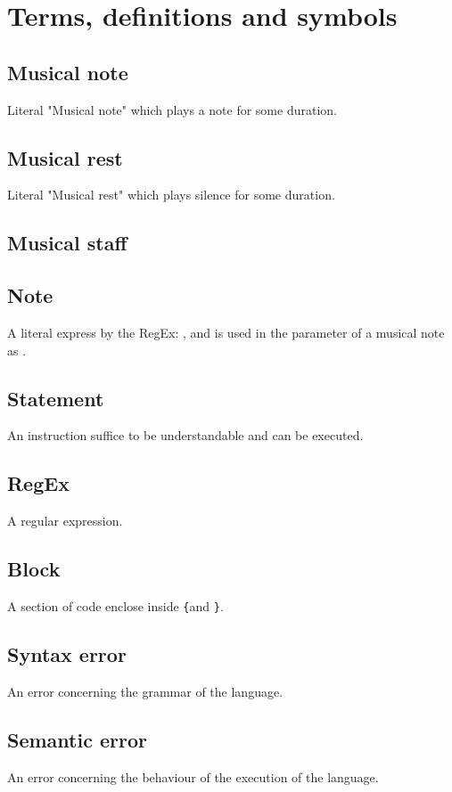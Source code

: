 \section{Terms, definitions and symbols}

\subsection{Musical note}

Literal "Musical note" which plays a note for some duration.

\subsection{Musical rest}

Literal "Musical rest" which plays silence for some duration.

\subsection{Musical staff}

\subsection{Note}

A literal express by the RegEx: \protect{}, and is used
in the parameter of a musical note as .

\subsection{Statement}
An instruction suffice to be understandable and can be executed.

\subsection{RegEx}

A regular expression.

\subsection{Block}

A section of code enclose inside \verb+{+and \verb+}+.

\subsection{Syntax error}

An error concerning the grammar of the language.

\subsection{Semantic error}

An error concerning the behaviour of the execution of the language.

